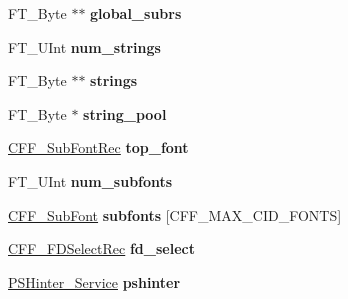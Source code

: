 \begin{DoxyCompactItemize}
\mbox{\label{struct_c_f_f___font_rec___a2f3d4784b9f30b0df597497ee86f7f6c}} 
F\+T\+\_\+\+Byte $\ast$$\ast$ {\bfseries global\+\_\+subrs}
\item 
\mbox{\label{struct_c_f_f___font_rec___a0034280bdb0e8cef4c204feadbd40850}} 
F\+T\+\_\+\+U\+Int {\bfseries num\+\_\+strings}
\item 
\mbox{\label{struct_c_f_f___font_rec___ad96f788d71f3f0a39705d510327d12e0}} 
F\+T\+\_\+\+Byte $\ast$$\ast$ {\bfseries strings}
\item 
\mbox{\label{struct_c_f_f___font_rec___ac833d93726b11e36b0990c1dad1f15b3}} 
F\+T\+\_\+\+Byte $\ast$ {\bfseries string\+\_\+pool}
\item 
\mbox{\label{struct_c_f_f___font_rec___a62120839c2d743718806b72799e3af67}} 
\hyperlink{struct_c_f_f___sub_font_rec__}{C\+F\+F\+\_\+\+Sub\+Font\+Rec} {\bfseries top\+\_\+font}
\item 
\mbox{\label{struct_c_f_f___font_rec___a325d7331c2f2608ffc47860c2414424a}} 
F\+T\+\_\+\+U\+Int {\bfseries num\+\_\+subfonts}
\item 
\mbox{\label{struct_c_f_f___font_rec___a3e915487d0ab4eeeed395e8f1da25935}} 
\hyperlink{struct_c_f_f___sub_font_rec__}{C\+F\+F\+\_\+\+Sub\+Font} {\bfseries subfonts} \mbox{[}C\+F\+F\+\_\+\+M\+A\+X\+\_\+\+C\+I\+D\+\_\+\+F\+O\+N\+TS\mbox{]}
\item 
\mbox{\label{struct_c_f_f___font_rec___a91a0f13516ff978c498355205c639342}} 
\hyperlink{struct_c_f_f___f_d_select_rec__}{C\+F\+F\+\_\+\+F\+D\+Select\+Rec} {\bfseries fd\+\_\+select}
\item 
\mbox{\label{struct_c_f_f___font_rec___aec2f775cc0810d730bb208444e58aa0d}} 
\hyperlink{struct_p_s_hinter___interface__}{P\+S\+Hinter\+\_\+\+Service} {\bfseries pshinter}
\item 
\mbox{\label{struct_c_f_f___font_rec___a2d136551bc9f8c4bcb1b99a284bd0211}} 

\end{DoxyCompactItemize}
